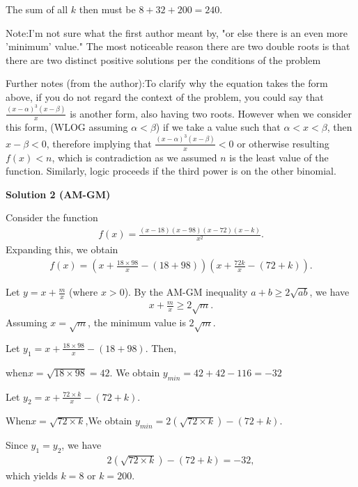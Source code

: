 \begin{enumerate}
 The sum of all $k$ then must be $8+32+200=\boxed{240}$.

 Note:I'm not sure what the first author meant by, "or else there is an even more 'minimum' value." The most noticeable reason there are two double roots is that there are two distinct positive solutions per the conditions of the problem

 Further notes (from the author):To clarify why the equation takes the form above, if you do not regard the context of the problem, you could say that $\frac{(x-\alpha)^3(x-\beta)}{x}$ is another form, also having two roots. However when we consider this form, (WLOG assuming $\alpha < \beta$) if we take a value such that $\alpha < x < \beta$, then $x-\beta < 0$, therefore implying that $\frac{(x-\alpha)^3(x-\beta)}{x}<0$ or otherwise resulting $f(x)<n$, which is contradiction as we assumed $n$ is the least value of the function. Similarly, logic proceeds if the third power is on the other binomial.

 



\textbf{Solution 2 (AM-GM)}

Consider the function\begin{align*}f(x) = \frac{(x - 18)(x - 98)(x - 72)(x - k)}{x^2}.\end{align*}
Expanding this, we obtain\begin{align*}f(x) = \left( x + \frac{18 \times 98}{x} - (18 + 98)\right)\left( x + \frac{72k}{x} - (72 + k) \right).\end{align*}


 Let \( y = x + \frac{m}{x} \) (where \( x > 0 \)). By the AM-GM inequality \( a + b \geq 2\sqrt{ab} \), we have\begin{align*}x + \frac{m}{x} \geq 2\sqrt{m}.\end{align*}
Assuming \( x = \sqrt{m} \), the minimum value is \( 2\sqrt{m} \).

 Let \( y_1 = x + \frac{18 \times 98}{x}  - (18 + 98) \). Then,

 when\(x  = \sqrt{18 \times 98} = 42.\) We obtain \(y_{min} = 42+42-116 =-32\)

 Let \( y_2 = x + \frac{72 \times k}{x} - (72 + k) \). 

 When\(x  = \sqrt{72 \times k}\),We obtain \(y_{min} = 2(\sqrt{72 \times k})-(72+k)\).

 Since \( y_1 = y_2 \), we have\begin{align*}2(\sqrt{72 \times k})-(72+k) = -32,\end{align*}
which yields \( k = 8 \) or \( k = 200 \).


\end{enumerate}
